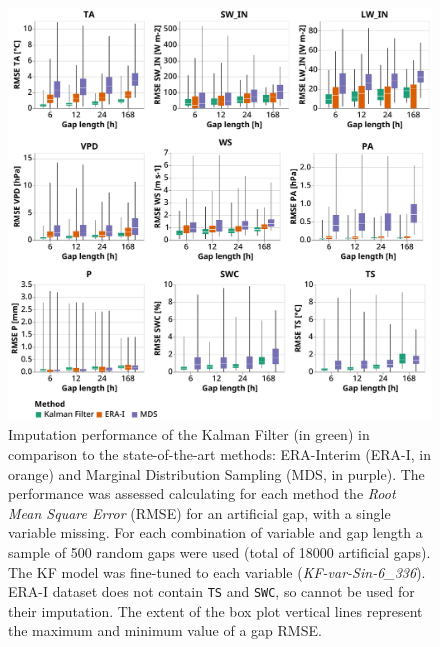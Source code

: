\documentclass{article}
\newcommand{\imgwidth}{6in}
\begin{document}
\begin{figure}
    \centerline{\includegraphics[width=\imgwidth]{the_plot}}
\caption{ Imputation performance of the Kalman Filter (in green) in comparison to the state-of-the-art methods: ERA-Interim (ERA-I, in orange) and Marginal Distribution Sampling (MDS, in purple). The performance was assessed calculating for each method the \textit{Root Mean Square Error} (RMSE) for an artificial gap, with a single variable missing. For each combination of variable and gap length a sample of 500 random gaps were used (total of 18000 artificial gaps).
The KF model was fine-tuned to each variable (\textit{KF-\textlangle var\textrangle-Sin-6\_336}). ERA-I dataset does not contain \texttt{TS} and \texttt{SWC}, so cannot be used for their imputation. The extent of the box plot vertical lines represent the maximum and minimum value of a gap RMSE.}
\label{fig:the_plot}
\end{figure}

\newcommand{\CapTheTable}{Imputation performance of the Kalman filter in comparison to the state-of-the-art
methods: ERA-Interim (ERA-I) and Marginal Distribution Sampling (MDS), using mean and standard deviation of the \textit{Root Mean Square Error} (RMSE). The best method for each gap length is highlighted in bold. For each combination of gap length and variable, 500 artificial gaps were created.}

\end{document}
